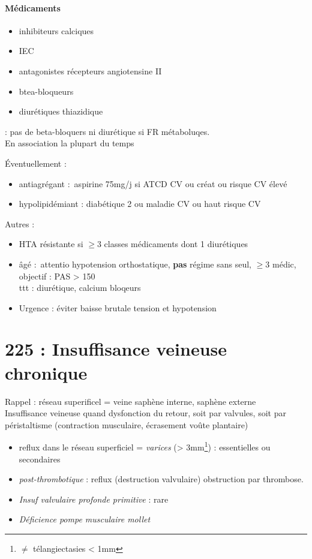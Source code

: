 \documentclass{article}
\begin{document}
\paragraph{Médicaments}
\begin{itemize}
  \item inhibiteurs calciques
  \item IEC
  \item antagonistes récepteurs angiotensine II
  \item btea-bloqueurs
  \item diurétiques thiazidique
\end{itemize}
\danger : pas de beta-bloquers ni diurétique si FR métaboluqes.\\

En association la plupart du temps

Éventuellement :
\begin{itemize}
  \item antiagrégant : aspirine 75mg/j si ATCD CV ou créat ou risque CV élevé
  \item hypolipidémiant : diabétique 2 ou maladie CV ou haut risque CV
\end{itemize}

Autres :
\begin{itemize}
  \item HTA résistante si $\ge 3$ classes médicaments dont 1 diurétiques
  \item âgé : attentio hypotension orthostatique, \textbf{pas} régime sans seul,
    $\ge 3$ médic, objectif : PAS > 150\\
    ttt : diurétique, calcium bloqeurs
  \item Urgence : éviter baisse brutale tension et hypotension \skull
\end{itemize}
\section{225 : Insuffisance veineuse chronique}%
\label{sec:225_insuffisance_veineuse_chronique}

Rappel : réseau superificel = veine saphène interne, saphène externe\\
Insuffisance veineuse quand dysfonction du retour, soit par valvules, soit par
péristaltisme (contraction musculaire, écrasement voûte plantaire)

\begin{itemize}
  \item reflux dans le réseau superficiel = \textit{varices}  (>
    3mm\footnote{$\neq$ télangiectasies < 1mm}) : essentielles ou
    secondaires
  \item \textit{post-thrombotique} : reflux (destruction valvulaire) \lor{} obstruction par thrombose. 
  \item \textit{Insuf valvulaire profonde primitive} : rare
  \item \textit{Déficience pompe musculaire mollet} 
\end{itemize}
\end{document}
